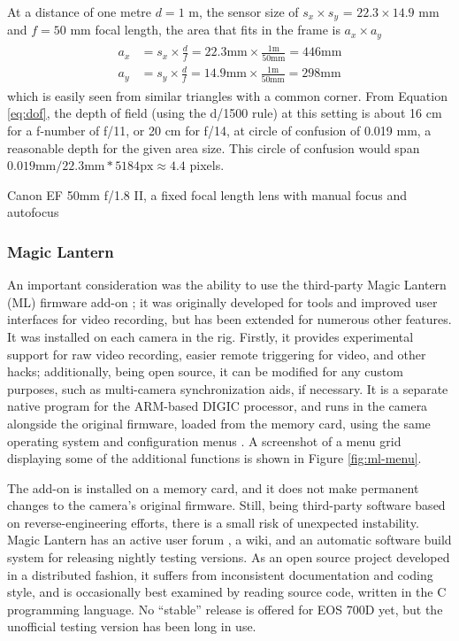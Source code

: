 At a distance of one metre $d = 1$ m, the sensor size of $s_x \times s_y$ = $22.3 \times 14.9$ mm and $f = 50$ mm focal length, the area that fits in the frame is $a_x \times a_y$
\begin{align} \label{eq:areasize} \begin{split}
	a_x &= s_x \times \frac{d}{f} = 22.3 \text{mm} \times \frac{1 \text{m}}{50 \text{mm}} = 446 \text{mm}\\
	a_y &= s_y \times \frac{d}{f} = 14.9 \text{mm} \times \frac{1 \text{m}}{50 \text{mm}} = 298 \text{mm}
\end{split} \end{align}
which is easily seen from similar triangles with a common corner.
From Equation \ref{eq:dof}, the depth of field (using the d/1500 rule) at this setting is about 16 cm for a f-number of f/11, or 20 cm for f/14, at circle of confusion of 0.019 mm, a reasonable depth for the given area size.
This circle of confusion would span $0.019 \text{mm} / 22.3 \text{mm} * 5184 \text{px} \approx 4.4$ pixels.

{Canon EF 50mm f/1.8 II, a fixed focal length lens with manual focus and autofocus}

\subsubsection{Magic Lantern}

An important consideration was the ability to use the third-party Magic Lantern (ML) firmware add-on \cite{magiclantern};
it was originally developed for tools and improved user interfaces for video recording, but has been extended for numerous other features.
It was installed on each camera in the rig.
Firstly, it provides experimental support for raw video recording, easier remote triggering for video, and other hacks;
additionally, being open source, it can be modified for any custom purposes, such as multi-camera synchronization aids, if necessary.
It is a separate native program for the ARM-based DIGIC processor, and runs in the camera alongside the original firmware, loaded from the memory card, using the same operating system and configuration menus \cite{magiclantern}.
A screenshot of a menu grid displaying some of the additional functions is shown in Figure \ref{fig:ml-menu}.

The add-on is installed on a memory card, and it does not make permanent changes to the camera's original firmware.
Still, being third-party software based on reverse-engineering efforts, there is a small risk of unexpected instability.
Magic Lantern has an active user forum \cite{magiclanternforum}, a wiki, and an automatic software build system for releasing nightly testing versions.
As an open source project developed in a distributed fashion, it suffers from inconsistent documentation and coding style, and is occasionally best examined by reading source code, written in the C programming language.
No ``stable'' release is offered for EOS 700D yet, but the unofficial testing version has been long in use.

